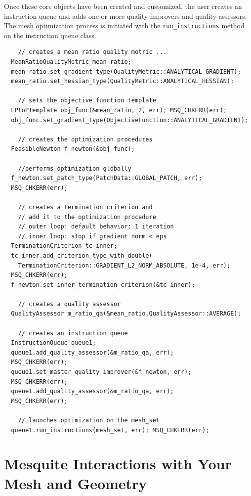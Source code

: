 \documentclass[letter]{report}
\begin{document}
Once these core objects have been created and customized, the user
creates an instruction queue and adds one or more quality improvers
and quality assessors.  The mesh optimization process is initiated
with the {\tt run\_instructions} method on the instruction queue
class.
\begin{verbatim}
    // creates a mean ratio quality metric ...
  MeanRatioQualityMetric mean_ratio;
  mean_ratio.set_gradient_type(QualityMetric::ANALYTICAL_GRADIENT);
  mean_ratio.set_hessian_type(QualityMetric::ANALYTICAL_HESSIAN);

    // sets the objective function template
  LPtoPTemplate obj_func(&mean_ratio, 2, err); MSQ_CHKERR(err);
  obj_func.set_gradient_type(ObjectiveFunction::ANALYTICAL_GRADIENT);
  
    // creates the optimization procedures
  FeasibleNewton f_newton(&obj_func);

    //performs optimization globally
  f_newton.set_patch_type(PatchData::GLOBAL_PATCH, err); 
  MSQ_CHKERR(err);

    // creates a termination criterion and 
    // add it to the optimization procedure
    // outer loop: default behavior: 1 iteration
    // inner loop: stop if gradient norm < eps
  TerminationCriterion tc_inner;
  tc_inner.add_criterion_type_with_double(
    TerminationCriterion::GRADIENT_L2_NORM_ABSOLUTE, 1e-4, err); 
  MSQ_CHKERR(err);
  f_newton.set_inner_termination_criterion(&tc_inner);

    // creates a quality assessor
  QualityAssessor m_ratio_qa(&mean_ratio,QualityAssessor::AVERAGE);

    // creates an instruction queue
  InstructionQueue queue1;
  queue1.add_quality_assessor(&m_ratio_qa, err); 
  MSQ_CHKERR(err);
  queue1.set_master_quality_improver(&f_newton, err); 
  MSQ_CHKERR(err);
  queue1.add_quality_assessor(&m_ratio_qa, err); 
  MSQ_CHKERR(err);

    // launches optimization on the mesh_set
  queue1.run_instructions(mesh_set, err); MSQ_CHKERR(err);
\end{verbatim} 


\chapter{Mesquite Interactions with Your Mesh and Geometry}
\label{sec:meshes}
\end{document}
